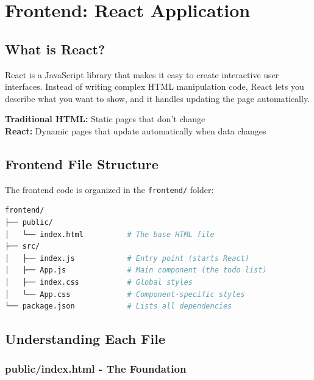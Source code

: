 \documentclass[12pt,a4paper]{article}
\begin{document}
\section{Frontend: React Application}

\subsection{What is React?}

React is a JavaScript library that makes it easy to create interactive user interfaces. Instead of writing complex HTML manipulation code, React lets you describe what you want to show, and it handles updating the page automatically.

\begin{tcolorbox}[colback=green!5!white,colframe=green!75!black,title=HTML vs React]
\textbf{Traditional HTML:} Static pages that don't change \\
\textbf{React:} Dynamic pages that update automatically when data changes
\end{tcolorbox}

\subsection{Frontend File Structure}

The frontend code is organized in the \texttt{frontend/} folder:

\begin{lstlisting}[language=bash, numbers=none]
frontend/
├── public/
│   └── index.html          # The base HTML file
├── src/
│   ├── index.js            # Entry point (starts React)
│   ├── App.js              # Main component (the todo list)
│   ├── index.css           # Global styles
│   └── App.css             # Component-specific styles
└── package.json            # Lists all dependencies
\end{lstlisting}

\subsection{Understanding Each File}

\subsubsection{public/index.html - The Foundation}
\end{document}
